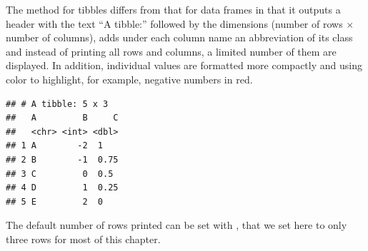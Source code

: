 \documentclass[krantz2]{krantz}\usepackage{knitr}
\begin{document}
\begin{explainbox}
The  method for tibbles differs from that for data frames in that it outputs a header with the text ``A tibble:'' followed by the dimensions (number of rows $\times$ number of columns), adds under each column name an abbreviation of its class and instead of printing all rows and columns, a limited number of them are displayed. In addition, individual values are formatted more compactly and using color to highlight, for example, negative numbers in red.

\begin{knitrout}\footnotesize
{}\color{fgcolor}\begin{kframe}
\begin{alltt}
\hlstd{(} \hlstd{= LETTERS[}\hlopt{:}\hlstd{],}  \hlstd{=} \hlopt{-}\hlopt{:}\hlstd{,}  \hlstd{=} \hlstd{(} \hlstd{=} \hlstd{,}  \hlstd{=} \hlstd{,}  \hlstd{=} \hlstd{))}
\end{alltt}
\begin{verbatim}
## # A tibble: 5 x 3
##   A         B     C
##   <chr> <int> <dbl>
## 1 A        -2  1   
## 2 B        -1  0.75
## 3 C         0  0.5 
## 4 D         1  0.25
## 5 E         2  0
\end{verbatim}
\end{kframe}
\end{knitrout}

The default number of rows printed can be set with , that we set here to only three rows for most of this chapter.

\begin{knitrout}\footnotesize
{}\color{fgcolor}\begin{kframe}
\begin{alltt}
\hlstd{(} \hlstd{=} \hlstd{,}  \hlstd{=} \hlstd{)}
\end{alltt}
\end{kframe}
\end{knitrout}
\end{explainbox}
\end{document}
